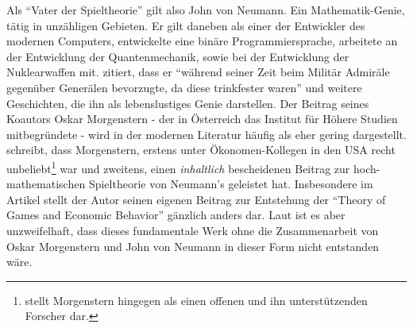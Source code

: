 Als "`Vater der Spieltheorie"' gilt also John von Neumann. Ein Mathematik-Genie, tätig in unzähligen Gebieten. Er gilt daneben als einer der Entwickler des modernen Computers, entwickelte eine binäre Programmiersprache,  arbeitete an der Entwicklung der Quantenmechanik, sowie bei der Entwicklung der Nuklearwaffen mit. \textcite[S. 232]{Bernstein1996} zitiert, dass er "`während seiner Zeit beim Militär Admiräle gegenüber Generälen bevorzugte, da diese trinkfester waren"' und weitere Geschichten, die ihn als lebenslustiges Genie darstellen. Der Beitrag seines Koautors Oskar Morgenstern - der in Österreich das Institut für Höhere Studien mitbegründete - wird in der modernen Literatur häufig als eher gering dargestellt. \textcite[S. 494]{Leonard1994} schreibt, dass Morgenstern, erstens unter Ökonomen-Kollegen in den USA recht unbeliebt\footnote{\textcite[S. 14]{Selten2001} stellt Morgenstern hingegen als einen offenen und ihn unterstützenden Forscher dar.} war und zweitens, einen \textit{inhaltlich} bescheidenen Beitrag zur hoch-mathematischen Spieltheorie von Neumann's geleistet hat. Insbesondere im Artikel \textcite{Morgenstern1976} stellt der Autor seinen eigenen Beitrag zur Entstehung der "`Theory of Games and Economic Behavior"' gänzlich anders dar. Laut \textcite{Nash1994} ist es aber unzweifelhaft, dass dieses fundamentale Werk ohne die Zusammenarbeit von Oskar Morgenstern und John von Neumann in dieser Form nicht entstanden wäre.

